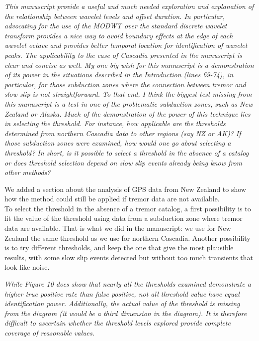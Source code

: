 \documentclass[letterpaper, 12pt]{article}
\begin{document}
\textit{This manuscript provide a useful and much needed exploration and explanation of the relationship between wavelet levels and offset duration. In particular, advocating for the use of the MODWT over the standard discrete wavelet transform provides a nice way to avoid boundary effects at the edge of each wavelet octave and provides better temporal location for identification of wavelet peaks. The applicability to the case of Cascadia presented in the manuscript is clear and concise as well. My one big wish for this manuscript is a demonstration of its power in the situations described in the Introduction (lines 69-74), in particular, for those subduction zones where the connection between tremor and slow slip is not straightforward. To that end, I think the biggest test missing from this manuscript is a test in one of the problematic subduction zones, such as New Zealand or Alaska. Much of the demonstration of the power of this technique lies in selecting the threshold. For instance, how applicable are the thresholds determined from northern Cascadia data to other regions (say NZ or AK)? If those subduction zones were examined, how would one go about selecting a threshold? In short, is it possible to select a threshold in the absence of a catalog or does threshold selection depend on slow slip events already being know from other methods?}

\bigskip

We added a section about the analysis of GPS data from New Zealand to show how the method could still be applied if tremor data are not available. \\

To select the threshold in the absence of a tremor catalog, a first possibility is to fit the value of the threshold using data from a subduction zone where tremor data are available. That is what we did in the manuscript: we use for New Zealand the same threshold as we use for northern Cascadia. Another possibility is to try different thresholds, and keep the one that give the most plausible results, with some slow slip events detected but without too much transients that look like noise.

\bigskip

\textit{While Figure 10 does show that nearly all the thresholds examined demonstrate a higher true positive rate than false positive, not all threshold value have equal identification power. Additionally, the actual value of the threshold is missing from the diagram (it would be a third dimension in the diagram). It is therefore difficult to ascertain whether the threshold levels explored provide complete coverage of reasonable values.}
\end{document}
